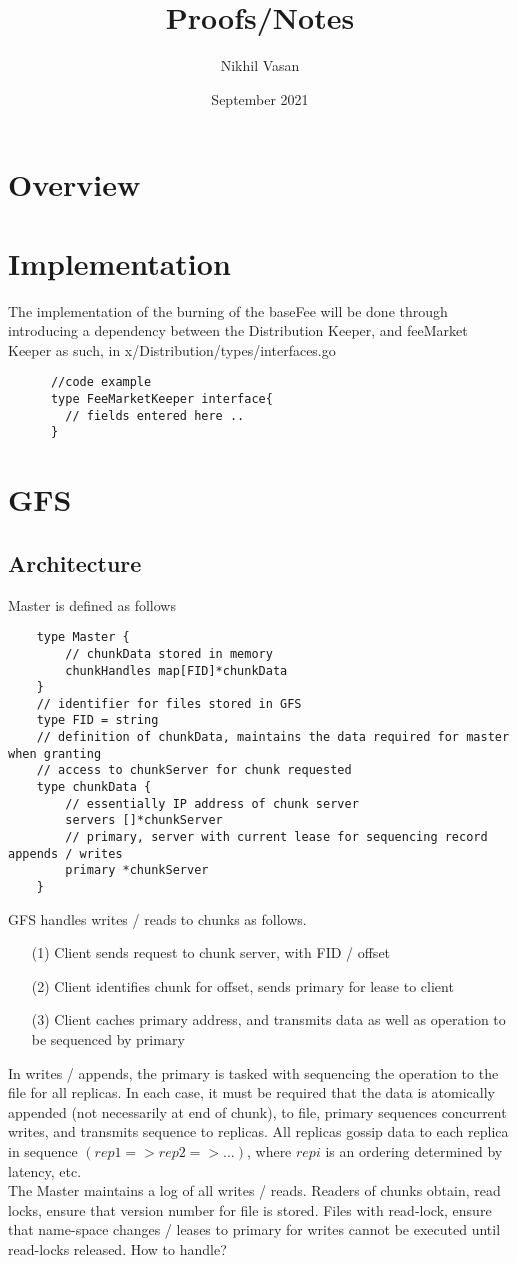 \documentclass{amsart}
\title{Proofs/Notes}
\author{Nikhil Vasan}
\date{September 2021}
\numberwithin{equation}{section}
\theoremstyle{plain}
\theoremstyle{definition}
\begin{document}
\maketitle
\section{Overview}
\section{Implementation}    
The implementation of the burning of the baseFee will be done through introducing a dependency between the Distribution Keeper, and feeMarket Keeper as such, in x/Distribution/types/interfaces.go
\begin{lstlisting}
      //code example
      type FeeMarketKeeper interface{ 
        // fields entered here ..
      }
\end{lstlisting}
\section{GFS}
\subsection*{Architecture}
Master is defined as follows
\begin{lstlisting}
    type Master {
        // chunkData stored in memory
        chunkHandles map[FID]*chunkData
    }
    // identifier for files stored in GFS
    type FID = string
    // definition of chunkData, maintains the data required for master when granting
    // access to chunkServer for chunk requested
    type chunkData {
        // essentially IP address of chunk server
        servers []*chunkServer
        // primary, server with current lease for sequencing record appends / writes
        primary *chunkServer
    }
\end{lstlisting}
GFS handles writes / reads to chunks as follows. 
\begin{enumerate}
    \item[(1)] Client sends request to chunk server, with FID / offset
    \item[(2)] Client identifies chunk for offset, sends primary for lease to client
    \item[(3)] Client caches primary address, and transmits data as well as operation to be sequenced by primary
\end{enumerate}
In writes / appends, the primary is tasked with sequencing the operation to the file for all replicas. 
In each case, it must be required that the data is atomically appended (not necessarily at end of chunk), 
to file, primary sequences concurrent writes, and transmits sequence to replicas. All replicas gossip data
to each replica in sequence $(rep 1 => rep 2 => ...)$, where $rep i$ is an ordering determined by latency, etc.
\\ The Master maintains a log of all writes / reads. Readers of chunks obtain, read locks, ensure that version number for file is stored.
Files with read-lock, ensure that name-space changes / leases to primary for writes cannot be executed until read-locks released.
How to handle?
\end{document}
